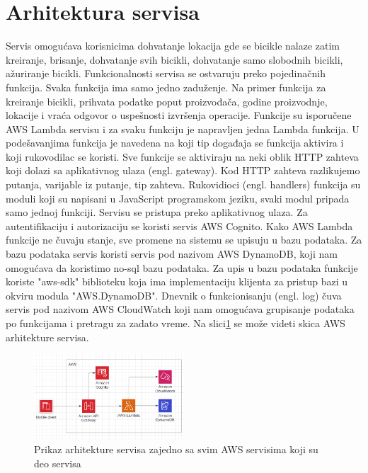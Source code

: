 \documentclass[12pt,oneside]{memoir}
\begin{document}
\section{Arhitektura servisa}
Servis omogućava korisnicima dohvatanje lokacija gde se bicikle nalaze zatim kreiranje, brisanje, dohvatanje svih bicikli, dohvatanje samo slobodnih bicikli, ažuriranje bicikli. Funkcionalnosti servisa se ostvaruju preko pojedinačnih funkcija. Svaka funkcija ima samo jedno zaduženje. Na primer funkcija za kreiranje bicikli, prihvata podatke poput proizvođača, godine proizvodnje, lokacije i vraća odgovor o uspešnosti izvršenja operacije. Funkcije su isporučene AWS Lambda servisu i za svaku funkciju je napravljen jedna Lambda funkcija. U podešavanjima funkcija je navedena na koji tip događaja se funkcija aktivira i koji rukovodilac se koristi. Sve funkcije se aktiviraju na neki oblik HTTP zahteva koji dolazi sa aplikativnog ulaza (engl. gateway). Kod HTTP zahteva razlikujemo putanja, varijable iz putanje, tip zahteva. Rukovidioci (engl. handlers) funkcija su moduli koji su napisani u JavaScript programskom jeziku, svaki modul pripada samo jednoj funkciji. Servisu se pristupa preko aplikativnog ulaza. Za autentifikaciju i autorizaciju se koristi servis AWS Cognito. Kako AWS Lambda funkcije ne čuvaju stanje, sve promene na sistemu se upisuju u bazu podataka. Za bazu podataka servis koristi servis pod nazivom AWS DynamoDB, koji nam omogućava da koristimo no-sql bazu podataka. Za upis u bazu podataka funkcije koriste "aws-sdk" biblioteku koja ima implementaciju klijenta za pristup bazi u okviru modula "AWS.DynamoDB". Dnevnik o funkcionisanju (engl. log) čuva servis pod nazivom AWS CloudWatch koji nam omogućava grupisanje podataka po funkcijama i pretragu za zadato vreme. Na slici\ref{fig:awsArchitecture} se može videti skica AWS arhitekture servisa.

\begin{figure}[!ht]
  \centering
  \includegraphics[width=0.5\textwidth]{AWS-Architecture-Overview.PNG}
  \caption{Prikaz arhitekture servisa zajedno sa svim AWS servisima koji su deo servisa}
  \label{fig:awsArchitecture}
\end{figure}
\end{document}
